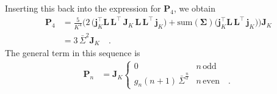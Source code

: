 \documentclass[modern]{aastex62}
\begin{document}
%
Inserting this back into the expression for $\mathbf{P}_4$, we obtain
%
\begin{align}
    \mathbf{P}_4 & =
    \frac{5}{K^4}
    \bigg(
    2 \, \big(\mathbf{j}_K^\top \mathbf{L} \, \mathbf{L}^\top \, \mathbf{J}_K \, \mathbf{L} \, \mathbf{L}^\top \, \mathbf{j}_K \big)
    +
    \mathrm{sum}(\pmb{\Sigma}) \big(\mathbf{j}_K^\top \mathbf{L} \, \mathbf{L}^\top \, \mathbf{j}_K \big)
    \bigg) \mathbf{J}_K
    \nonumber        \\
                 & =
    3 \, \bar{\Sigma}^2 \mathbf{J}_K
    \quad.
\end{align}
%
The general term in this sequence is
%
\begin{align}
    \mathbf{P}_n & =
    \mathbf{J}_K
    \begin{cases}
        0                                       & n \, \mathrm{odd}
        \\
        g_n (n + 1) \, \bar{\Sigma}^\frac{n}{2} & n \, \mathrm{even}
        \quad.
    \end{cases}
\end{align}
%
\end{document}
